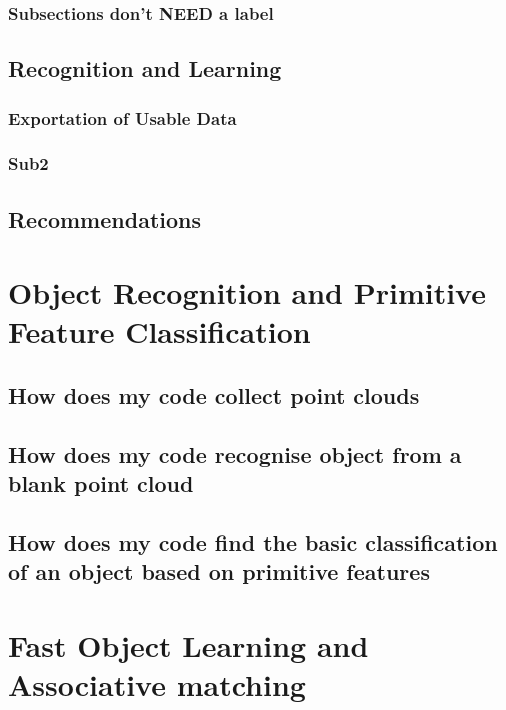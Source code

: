 \documentclass[12pt]{utscapstone}
\begin{document}
\subsection{Subsections don't NEED a label}


\section{Recognition and Learning}
\label{randl}

\subsection{Exportation of Usable Data}

\subsection{Sub2}
\label{sec:sub2label}

\section{Recommendations}
\label{sec:recommendations}

\chapter{Object Recognition and Primitive Feature Classification}
\label{recogniseclassify}

\section{How does my code collect point clouds}
\label{pccollection}

\section{How does my code recognise object from a blank point cloud}
\label{objectrecognise}

\section{How does my code find the basic classification of an object based on primitive features}
\label{classification}


\chapter{Fast Object Learning and Associative matching}
\label{fastlearningmatching}
\end{document}
